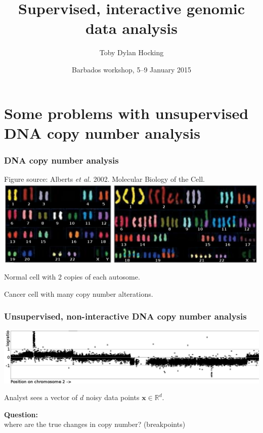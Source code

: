 \documentclass{beamer}
\newcommand{\RR}{\mathbb R}
\begin{document}
\title{Supervised, interactive genomic data analysis}
\author{
Toby Dylan Hocking
}

\date{Barbados workshop, 5--9 January 2015}

\maketitle

\section{Some problems with unsupervised
  DNA copy number analysis}

\begin{frame}
  \frametitle{DNA copy number analysis}

  Figure source: Alberts \textit{et al.} 2002. Molecular Biology of the Cell.
\vskip 0.1in
  \includegraphics[width=\textwidth]{Karyo-both}
\vskip 0.1in
  \begin{minipage}{0.4\linewidth}
    Normal cell with 2 copies of each autosome.
  \end{minipage}
\linewidth
  \begin{minipage}{0.4\linewidth}
Cancer cell with many copy number alterations.
  \end{minipage}

\end{frame}

\begin{frame}
  \frametitle{Unsupervised, non-interactive DNA copy number analysis}
  \includegraphics[width=\textwidth]{unlabeled-axes}

  Analyst sees a vector of $d$ noisy data points $\mathbf x\in\RR^d$.

  \vskip 0.1in

  \textbf{Question:}\\
  where are the true changes in copy
  number? (breakpoints)

\end{frame}
\end{document}
